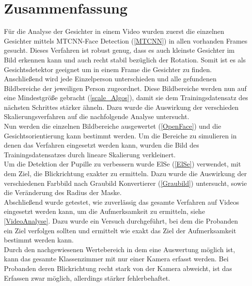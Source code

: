 \section{Zusammenfassung}
Für die Analyse der Gesichter in einem Video wurden zuerst die einzelnen Gesichter mittels MTCNN-Face Detection (\autoref{MTCNN}) in allen vorhanden Frames gesucht. Dieses Verfahren ist robust genug, dass es auch kleinste Gesichter im Bild erkennen kann und auch recht stabil bezüglich der Rotation. Somit ist es als Gesichtsdetektor geeignet um in einem Frame die Gesichter zu finden.\\
Anschließend wird jede Einzelperson unterschieden und alle gefundenen Bildbereiche der jeweiligen Person zugeordnet. Diese Bildbereiche werden nun auf eine Mindestgröße gebracht (\autoref{scale_Algos}), damit sie dem Trainingsdatensatz des nächsten Schrittes stärker ähneln. Dazu wurde die Auswirkung der verschieden Skalierungsverfahren auf die nachfolgende Analyse untersucht.\\
Nun werden die einzelnen Bildbereiche ausgewertet (\autoref{OpenFace}) und die Gesichtsorientierung kann bestimmt werden. Um die Bereiche zu simulieren in denen das Verfahren eingesetzt werden kann, wurden die Bild des Trainingsdatensatzes durch lineare Skalierung verkleinert.\\
Um die Detektion der Pupille zu verbessern wurde ElSe (\autoref{ElSe}) verwendet, mit dem Ziel, die Blickrichtung exakter zu ermitteln. Dazu wurde die Auswirkung der verschiedenen Farbbild nach Graubild Konvertierer (\autoref{Graubild}) untersucht, sowie die Veränderung des Radius der Maske.\\
Abschließend wurde getestet, wie zuverlässig das gesamte Verfahren auf Videos eingesetzt werden kann, um die Aufmerksamkeit zu ermitteln, siehe \autoref{VideoAnalyse}. Dazu wurde ein Versuch durchgeführt, bei dem die Probanden ein Ziel verfolgen sollten und ermittelt wie exakt das Ziel der Aufmerksamkeit bestimmt werden kann.\\
Durch den nachgewiesenen Wertebereich in dem eine Auswertung möglich ist, kann das gesamte Klassenzimmer mit nur einer Kamera erfasst werden. Bei Probanden deren Blickrichtung recht stark von der Kamera abweicht, ist das Erfassen zwar möglich, allerdings stärker fehlerbehaftet.